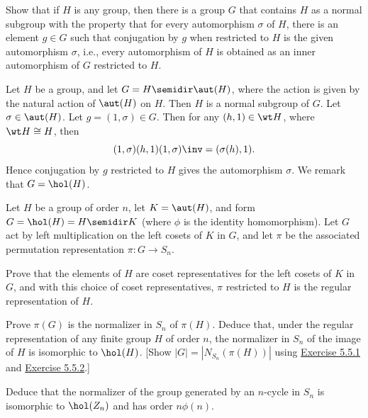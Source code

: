\begin{specialexercise}\label{ex5.5.18}
    Show that if $H$ is any group, then there is a group $G$ that contains $H$ as a normal subgroup with the property that for every automorphism $\sigma$ of $H$, there is an element $g \in G$ such that conjugation by $g$ when restricted to $H$ is the given automorphism $\sigma$, i.e., every automorphism of $H$ is obtained as an inner automorphism of $G$ restricted to $H$.
\end{specialexercise}

\begin{sol}
    Let $H$ be a group, and let $G = H \semidir \aut(H)$, where the action is given by the natural action of $\aut(H)$ on $H$. Then $H$ is a normal subgroup of $G$. Let $\sigma \in \aut(H)$. Let $g = (1, \sigma) \in G$. Then for any $(h, 1) \in \wt H$, where $\wt H \cong H$, then
    \[(1, \sigma)(h, 1)(1, \sigma)\inv = ( \sigma(h), 1).\]
    Hence conjugation by $g$ restricted to $H$ gives the automorphism $\sigma$. We remark that $G = \hol(H)$.
\end{sol}

\begin{exercise}\label{ex5.5.19}
    Let $H$ be a group of order $n$, let $K = \aut(H)$, and form $G = \hol(H) = H \semidir K$ (where $\phi$ is the identity homomorphism). Let $G$ act by left multiplication on the left cosets of $K$ in $G$, and let $\pi$ be the associated permutation representation $\pi : G \to S_n$.
    \begin{subproblems}
        \item Prove that the elements of $H$ are coset representatives for the left cosets of $K$ in $G$, and with this choice of coset representatives, $\pi$ restricted to $H$ is the regular representation of $H$.
        \item Prove $\pi(G)$ is the normalizer in $S_n$ of $\pi(H)$. Deduce that, under the regular representation of any finite group $H$ of order $n$, the normalizer in $S_n$ of the image of $H$ is isomorphic to $\hol(H)$. [Show $|G| = |N_{S_n}(\pi(H))|$ using \hyperref[ex5.5.1]{Exercise 5.5.1} and \hyperref[ex5.5.2]{Exercise 5.5.2}.]
        \item Deduce that the normalizer of the group generated by an $n$-cycle in $S_n$ is isomorphic to $\hol(Z_n)$ and has order $n\phi(n)$.
    \end{subproblems}
\end{exercise}

